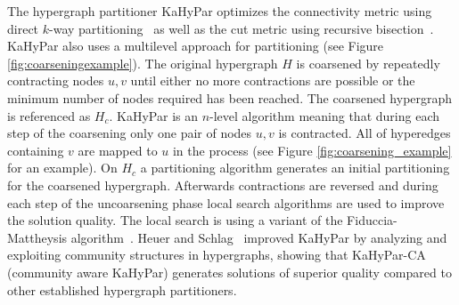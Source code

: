 \documentclass[a4paper,12pt,titlepage, BCOR7mm,headsepline]{scrbook}
\numberwithin{equation}{section}
\begin{document}
The hypergraph partitioner KaHyPar optimizes the connectivity metric using direct $k$-way partitioning~\cite{akhremtsev2017engineering} as well as the cut metric using recursive bisection~\cite{schlag2016k}.  
KaHyPar also uses a multilevel approach for partitioning (see Figure \ref{fig:coarseningexample}). The original hypergraph $H$ is coarsened by repeatedly contracting nodes $u,v$ until either no more contractions are possible or the minimum number of nodes required has been reached. The coarsened hypergraph is referenced as $H_c$. KaHyPar is an $n$-level algorithm meaning that during each step of the coarsening only one pair of nodes $u, v$ is contracted. All of hyperedges containing $v$ are mapped to $u$ in the process (see Figure \ref{fig:coarsening_example} for an example). 
On $H_c$ a partitioning algorithm generates an initial partitioning for the coarsened hypergraph. Afterwards contractions are reversed and 
during each step of the uncoarsening phase local search algorithms are used to improve the solution quality. The local search is using a variant of the Fiduccia-Mattheysis algorithm~\cite{fiduccia1988linear}. 
Heuer and Schlag~\cite{heuer2017improving} improved KaHyPar by analyzing and exploiting community structures in hypergraphs, showing that KaHyPar-CA (community aware KaHyPar) generates solutions of superior quality compared to other established hypergraph partitioners.
\end{document}
